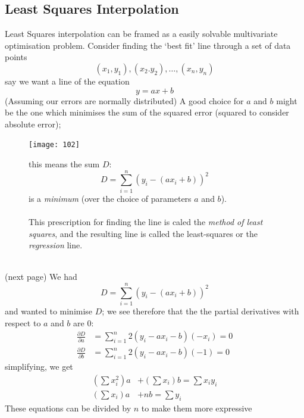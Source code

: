 \documentclass{report}
\begin{document}
\subsection{Least Squares Interpolation} %
Least Squares interpolation can be framed as a easily solvable multivariate optimisation problem. Consider finding
the `best fit' line through a set of data points
\begin{equation*}
(x_1,y_1),(x_2.y_2),\ldots,(x_n,y_n)
\end{equation*}
say we want a line of the equation
\begin{equation*}
y=ax+b
\end{equation*}
(Assuming our errors are normally distributed) A good choice for $a$ and $b$ might be the one which minimises
the sum of the squared error (squared to consider absolute error); 
\begin{figure}[h]
\begin{center}
\texttt{[image: 102]}\\
\end{center}
this means the sum $D$:
\begin{equation*}
D=\sum^n_{i=1}(y_i-(ax_i+b))^2
\end{equation*}
is a \textit{minimum} (over the choice of parameters $a$ and $b$).\\
\vspace{1mm}\\
This prescription for finding the line is caled the \textit{method of least squares}, and the
resulting line is called the least-squares or the \textit{regression} line.
\end{figure}\\
(next page)
\newpage
\noindent We had 
\begin{equation*}
D=\sum^n_{i=1}(y_i-(ax_i+b))^2
\end{equation*}
and wanted to minimise $D$; we see therefore that the the partial derivatives with respect to $a$ and $b$ are 0:
\begin{align*}
\frac{\partial D}{\partial a}&=\sum^n_{i=1}
2(y_i-ax_i-b)(-x_i)=0\\
\frac{\partial D}{\partial b}&=\sum^n_{i=1}
2(y_i-ax_i-b)(-1)=0
\end{align*}
simplifying, we get
\begin{align*}
\left(\sum x_i^2\right)a&+\left(\sum x_i\right)b=\sum x_iy_i\\
\left(\sum x_i\right)a&+nb=\sum y_i
\end{align*}
These equations can be divided by $n$ to make them more expressive
\end{document}
